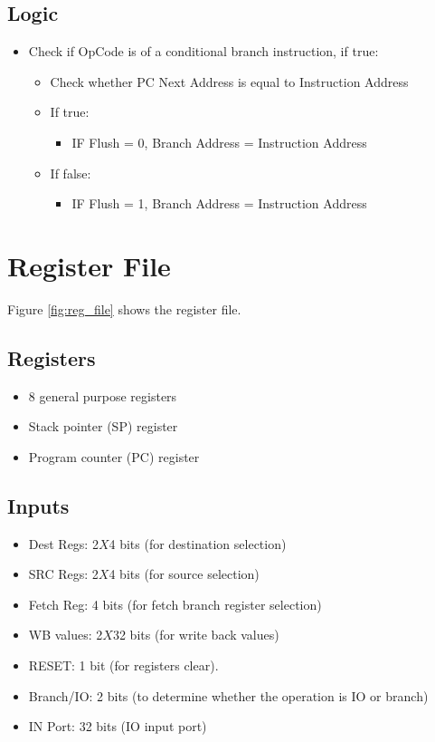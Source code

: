 \documentclass[12pt]{report}
\begin{document}
\subsection{Logic}
\begin{itemize}
    \item Check if OpCode is of a conditional branch instruction, if true:
    \begin{itemize}
        \item Check whether PC Next Address is equal to Instruction Address
        \item If true:
        \begin{itemize}
            \item IF Flush = 0, Branch Address = Instruction Address
        \end{itemize}
        \item If false:
        \begin{itemize}
            \item IF Flush = 1, Branch Address = Instruction Address
        \end{itemize}
    \end{itemize}
\end{itemize}

\section{Register File}
Figure \ref{fig:reg_file} shows the register file.

\subsection{Registers}
\begin{itemize}
    \item 8 general purpose registers
    \item Stack pointer (SP) register
    \item Program counter (PC) register
\end{itemize}

\subsection{Inputs}
\begin{itemize}
    \item Dest Regs: 2$X$4 bits (for destination selection)
    \item SRC Regs: 2$X$4 bits (for source selection)
    \item Fetch Reg: 4 bits (for fetch branch register selection)
    \item WB values: 2$X$32 bits (for write back values)
    \item RESET: 1 bit (for registers clear).
    \item Branch/IO: 2 bits (to determine whether the operation is IO or branch)
    \item IN Port: 32 bits (IO input port)
\end{itemize}
\end{document}
